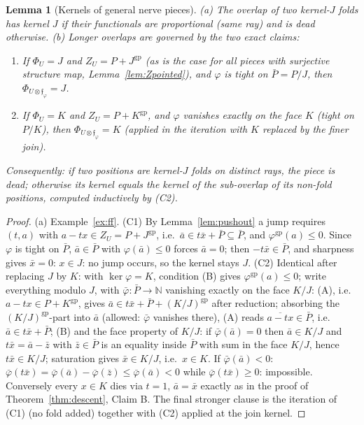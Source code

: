 \documentclass[11pt]{article}
\newtheorem{lemma}[theorem]{Lemma}
\theoremstyle{definition}
\newcommand{\gp}{\mathrm{gp}}
\begin{document}
\begin{lemma}[Kernels of general nerve pieces]\label{lem:mixed}
\textup{(}a\textup{)} The overlap of two kernel-$J$ folds has
kernel $J$ if their functionals are proportional
\textup{(}same ray\textup{)} and is dead otherwise.
\textup{(}b\textup{)} Longer overlaps are governed by the two
exact claims:
\begin{enumerate}[label=\textup{(}C\arabic*\textup{)}]
\item If $\Phi_U=J$ and $Z_U=P+J^{\gp}$ \textup{(}as is the case
for all pieces with surjective structure map,
Lemma~\ref{lem:Zpointed}\textup{)}, and $\varphi$ is tight on
$\bar P=P/J$, then $\Phi_{U\otimes\mathfrak f_\varphi}=J$.
\item If $\Phi_U=K$ and $Z_U=P+K^{\gp}$, and $\varphi$ vanishes
exactly on the face $K$ \textup{(}tight on $P/K$\textup{)},
then $\Phi_{U\otimes\mathfrak f_\varphi}=K$ \textup{(}applied
in the iteration with $K$ replaced by the finer
join\textup{)}.
\end{enumerate}
Consequently: if two positions are kernel-$J$ folds on distinct
rays, the piece is dead; otherwise its kernel equals the kernel
of the sub-overlap of its non-fold positions, computed
inductively by \textup{(}C2\textup{)}.
\end{lemma}

\begin{proof}
(a) Example~\ref{ex:ff}.
(C1) By Lemma~\ref{lem:pushout} a jump requires
$(t,a)$ with $a-tx\in Z_U=P+J^{\gp}$, i.e.\
$\bar a\in t\bar x+\bar P\subseteq\bar P$, and
$\varphi^{\gp}(a)\le0$. Since $\varphi$ is tight on $\bar P$,
$\bar a\in\bar P$ with $\varphi(\bar a)\le0$ forces
$\bar a=0$; then $-t\bar x\in\bar P$, and sharpness gives
$\bar x=0$: $x\in J$: no jump occurs, so the kernel stays $J$.
(C2) Identical after replacing $J$ by $K$: with
$\ker\varphi=K$, condition (B) gives
$\varphi^{\gp}(a)\le0$; write
everything modulo $J$, with $\bar\varphi:\bar P\to\mathbb N$
vanishing exactly on the face $K/J$: (A), i.e.\
$a-tx\in P+K^{\gp}$, gives
$\bar a\in t\bar x+\bar P+(K/J)^{\gp}$ after reduction;
absorbing the $(K/J)^{\gp}$-part into $\bar a$ (allowed:
$\bar\varphi$ vanishes there), (A) reads
$\overline{a-tx}\in\bar P$, i.e.\ $\bar a\in t\bar x+\bar P$;
(B) and the face property of $K/J$: if $\bar\varphi(\bar a)=0$
then $\bar a\in K/J$ and $t\bar x=\bar a-\bar z$ with
$\bar z\in\bar P$ is an equality inside $\bar P$ with sum in the
face $K/J$, hence $t\bar x\in K/J$; saturation gives
$\bar x\in K/J$, i.e.\ $x\in K$. If
$\bar\varphi(\bar a)<0$: $\bar\varphi(t\bar x)=
\bar\varphi(\bar a)-\bar\varphi(\bar z)\le\bar\varphi(\bar a)<0$
while $\bar\varphi(t\bar x)\ge0$: impossible. Conversely every
$x\in K$ dies via $t=1$, $\bar a=\bar x$ exactly as in the proof
of Theorem~\ref{thm:descent}, Claim B.
The final stronger clause is the iteration of (C1) (no fold
added) together with (C2) applied at the join kernel.
\end{proof}
\end{document}
